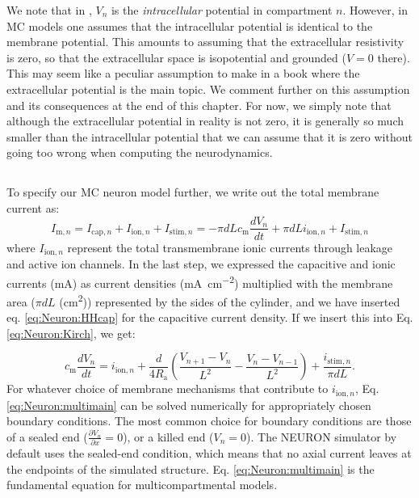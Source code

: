 We note that in , $V_n$ is the \emph{intracellular} potential in compartment $n$. However, in MC models one assumes that the intracellular potential is identical to the membrane potential. This amounts to assuming that the extracellular resistivity is zero, so that the extracellular space is isopotential and grounded ($V = 0$ there). This may seem like a peculiar assumption to make in a book where the extracellular potential is the main topic. We comment further on this assumption and its consequences at the end of this chapter. For now, we simply note that although the extracellular potential in reality is not zero, it is generally so much smaller than the intracellular potential that we can assume that it is zero without going too wrong when computing the neurodynamics. 


\subsection{}
\label{sec:Neuron:Active_multicomp}
To specify our MC neuron model further, we write out the total membrane current as:
\begin{equation}
I_{\mathrm{m},n} = I_{\mathrm{cap},n} + I_{\mathrm{ion},n} + I_{\mathrm{stim},n} = -\pi d L c_\text{m} \frac{dV_n}{dt} + \pi d L i_{\mathrm{ion},n} + I_{\mathrm{stim},n}
\label{eq:Neuron:Imemb}
\end{equation}
where $I_{\mathrm{ion},n}$ represent the total transmembrane ionic currents through leakage and active ion channels. In the last step, we expressed the capacitive and ionic currents (\si{\milli\ampere}) as current densities (\si{\milli\ampere\per\square\centi\metre}) multiplied with the membrane area ($\pi d L$ (\si{\square\centi\metre})) represented by the sides of the cylinder, and we have inserted eq. \ref{eq:Neuron:HHcap} for the capacitive current density. If we insert this into Eq. \ref{eq:Neuron:Kirch}, we get:

\begin{equation}
c_\text{m} \frac{dV_n}{dt} = i_{\mathrm{ion},n} + \frac{d}{4R_\text{a}}\left(\frac{V_{n+1}-V_n}{L^2} - \frac{V_n-V_{n-1}}{L^2} \right) + \frac{i_{\mathrm{stim},n}}{\pi d L}.
\label{eq:Neuron:multimain}
\end{equation}
For whatever choice of membrane mechanisms that contribute to $i_{\mathrm{ion},n}$, Eq. \ref{eq:Neuron:multimain} can be solved numerically for appropriately chosen boundary conditions. The most common choice for boundary conditions are those of a sealed end ($\frac{\partial V_n}{\partial x} = 0$), or a killed end ($V_n=0$). The NEURON simulator by default uses the sealed-end condition, which means that no axial current leaves at the endpoints of the simulated structure. Eq. \ref{eq:Neuron:multimain} is the fundamental equation for multicompartmental models.




